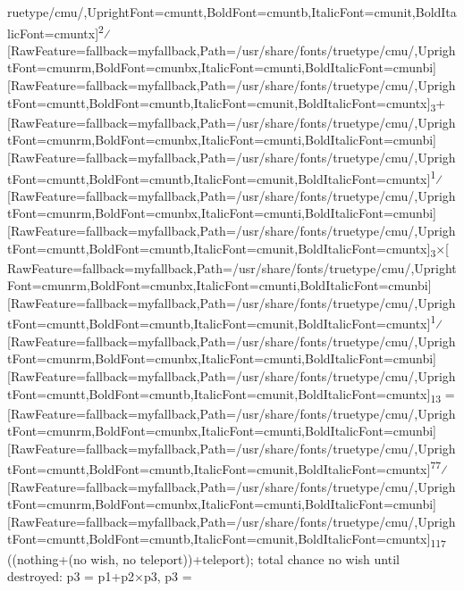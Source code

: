 \begin{myenumerate}
ruetype/cmu/,UprightFont=cmuntt,BoldFont=cmuntb,ItalicFont=cmunit,BoldItalicFont=cmuntx]\textsuperscript{2}⁄\allowbreak{}\setmainfont{cmunrm.ttf}[RawFeature={fallback=myfallback},Path=/usr/share/fonts/truetype/cmu/,UprightFont=cmunrm,BoldFont=cmunbx,ItalicFont=cmunti,BoldItalicFont=cmunbi]\setmonofont{cmunrm.ttf}[RawFeature={fallback=myfallback},Path=/usr/share/fonts/truetype/cmu/,UprightFont=cmuntt,BoldFont=cmuntb,ItalicFont=cmunit,BoldItalicFont=cmuntx]\textsubscript{3}+\allowbreak{}\setmainfont{cmunrm.ttf}[RawFeature={fallback=myfallback},Path=/usr/share/fonts/truetype/cmu/,UprightFont=cmunrm,BoldFont=cmunbx,ItalicFont=cmunti,BoldItalicFont=cmunbi]\setmonofont{cmunrm.ttf}[RawFeature={fallback=myfallback},Path=/usr/share/fonts/truetype/cmu/,UprightFont=cmuntt,BoldFont=cmuntb,ItalicFont=cmunit,BoldItalicFont=cmuntx]\textsuperscript{1}⁄\allowbreak{}\setmainfont{cmunrm.ttf}[RawFeature={fallback=myfallback},Path=/usr/share/fonts/truetype/cmu/,UprightFont=cmunrm,BoldFont=cmunbx,ItalicFont=cmunti,BoldItalicFont=cmunbi]\setmonofont{cmunrm.ttf}[RawFeature={fallback=myfallback},Path=/usr/share/fonts/truetype/cmu/,UprightFont=cmuntt,BoldFont=cmuntb,ItalicFont=cmunit,BoldItalicFont=cmuntx]\textsubscript{3}×\allowbreak{}\setmainfont{cmunrm.ttf}[RawFeature={fallback=myfallback},Path=/usr/share/fonts/truetype/cmu/,UprightFont=cmunrm,BoldFont=cmunbx,ItalicFont=cmunti,BoldItalicFont=cmunbi]\setmonofont{cmunrm.ttf}[RawFeature={fallback=myfallback},Path=/usr/share/fonts/truetype/cmu/,UprightFont=cmuntt,BoldFont=cmuntb,ItalicFont=cmunit,BoldItalicFont=cmuntx]\textsuperscript{1}⁄\allowbreak{}\setmainfont{cmunrm.ttf}[RawFeature={fallback=myfallback},Path=/usr/share/fonts/truetype/cmu/,UprightFont=cmunrm,BoldFont=cmunbx,ItalicFont=cmunti,BoldItalicFont=cmunbi]\setmonofont{cmunrm.ttf}[RawFeature={fallback=myfallback},Path=/usr/share/fonts/truetype/cmu/,UprightFont=cmuntt,BoldFont=cmuntb,ItalicFont=cmunit,BoldItalicFont=cmuntx]\textsubscript{13} = \allowbreak{}\setmainfont{cmunrm.ttf}[RawFeature={fallback=myfallback},Path=/usr/share/fonts/truetype/cmu/,UprightFont=cmunrm,BoldFont=cmunbx,ItalicFont=cmunti,BoldItalicFont=cmunbi]\setmonofont{cmunrm.ttf}[RawFeature={fallback=myfallback},Path=/usr/share/fonts/truetype/cmu/,UprightFont=cmuntt,BoldFont=cmuntb,ItalicFont=cmunit,BoldItalicFont=cmuntx]\textsuperscript{77}⁄\allowbreak{}\setmainfont{cmunrm.ttf}[RawFeature={fallback=myfallback},Path=/usr/share/fonts/truetype/cmu/,UprightFont=cmunrm,BoldFont=cmunbx,ItalicFont=cmunti,BoldItalicFont=cmunbi]\setmonofont{cmunrm.ttf}[RawFeature={fallback=myfallback},Path=/usr/share/fonts/truetype/cmu/,UprightFont=cmuntt,BoldFont=cmuntb,ItalicFont=cmunit,BoldItalicFont=cmuntx]\textsubscript{117} ((nothing+(no wish, no teleport))+teleport); total chance no wish until destroyed: p3 = p1+p2×p3, p3 = 
\end{myenumerate}
